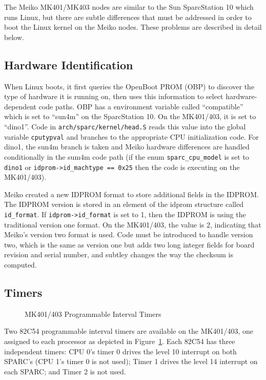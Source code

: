 \documentclass{article}
\begin{document}
  The Meiko MK401/MK403 nodes are similar to the Sun SparcStation 10
which runs Linux, but there are subtle differences that must be addressed 
in order to boot the Linux kernel on the Meiko nodes.  
These problems are described in detail below.

\subsection{Hardware Identification}

  When Linux boots, it first queries the OpenBoot PROM (OBP) to discover
the type of hardware it is running on, then uses this information to select
hardware-dependent code paths.  OBP has a environment variable called
``compatible'' which is set to ``sun4m'' on the SparcStation 10.  On
the MK401/403, it is set to ``dino1''.  Code in {\tt arch/sparc/kernel/head.S}
reads this value into the global variable {\tt cputypval} and branches to 
the appropriate CPU initialization code.  For dino1, the sun4m branch is
taken and Meiko hardware differences are handled conditionally in the sum4m 
code path (if the enum {\tt sparc\_cpu\_model} is set to {\tt dino1} or
{\tt idprom->id\_machtype == 0x25} then the code is executing on the 
MK401/403).

  Meiko created a new IDPROM format to store additional fields in the IDPROM.
The IDPROM version is stored in an element of the idprom structure called
{\tt id\_format}.  If {\tt idprom->id\_format} is set to 1, then the IDPROM
is using the traditional version one format.  On the MK401/403, the value is 
2, indicating that Meiko's version two format is used.  Code must be introduced
to handle version two, which is the same as version one but adds two long 
integer fields for board revision and serial number, and subtley changes the 
way the checksum is computed.

\subsection{Timers}\label{timers}

\begin{figure}
\begin{center}
\caption{MK401/403 Programmable Interval Timers}
\label{timer}
\end{center}
\end{figure}

  Two 82C54 programmable interval timers\cite{Harris97} 
are available on the MK401/403,
one assigned to each processor as depicted in Figure~\ref{timer}.  
Each 82C54 has three independent timers:
CPU 0's timer 0 drives the level 10 interrupt on both SPARC's (CPU 1's timer 
0 is not used); Timer 1 drives the level 14 interrupt on each SPARC;
and Timer 2 is not used.
\end{document}
